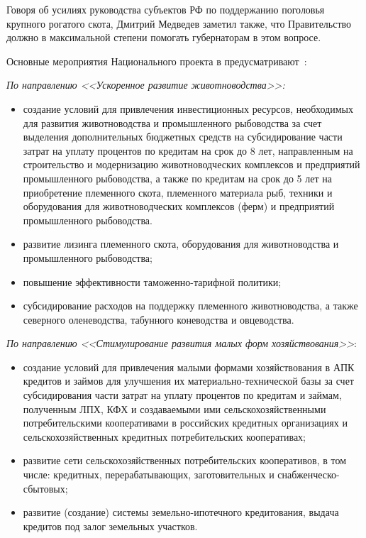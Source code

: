 \documentclass[article, 12pt, russian, oneside]{ncc}
\begin{document}
Говоря об усилиях руководства субъектов РФ по поддержанию поголовья
крупного рогатого скота, Дмитрий Медведев заметил также, что
Правительство должно в максимальной степени помогать губернаторам в
этом вопросе.

Основные мероприятия Национального проекта в
предусматривают~\cite{APK_Waitings}:

\emph{По направлению <<Ускоренное развитие животноводства>>:}

\begin{itemize}
\item создание условий для привлечения инвестиционных ресурсов,
  необходимых для развития животноводства и промышленного рыбоводства
  за счет выделения дополнительных бюджетных средств на субсидирование
  части затрат на уплату процентов по кредитам на срок до 8 лет,
  направленным на строительство и модернизацию животноводческих
  комплексов и предприятий промышленного рыбоводства, а также по
  кредитам на срок до 5 лет на приобретение племенного скота,
  племенного материала рыб, техники и оборудования для
  животноводческих комплексов (ферм) и предприятий промышленного
  рыбоводства. 
\item развитие лизинга племенного скота, оборудования для
  животноводства и промышленного рыбоводства;
\item повышение эффективности таможенно-тарифной политики;
\item субсидирование расходов на поддержку племенного животноводства,
  а также северного оленеводства, табунного коневодства и овцеводства.
\end{itemize}

\emph{По направлению <<Стимулирование развития малых форм
  хозяйствования>>}:

\begin{itemize}
\item создание условий для привлечения малыми формами хозяйствования в
  АПК кредитов и займов для улучшения их материально-технической базы
  за счет субсидирования части затрат на уплату процентов по кредитам
  и займам, полученным ЛПХ, КФХ и создаваемыми ими
  сельскохозяйственными потребительскими кооперативами в российских
  кредитных организациях и сельскохозяйственных кредитных
  потребительских кооперативах;
\item развитие сети сельскохозяйственных потребительских кооперативов,
  в том числе: кредитных, перерабатывающих, заготовительных и
  снаб\-жен\-чес\-ко-сбытовых;
\item развитие (создание) системы земельно-ипотечного кредитования,
  выдача кредитов под залог земельных участков.
\end{itemize}
\end{document}
